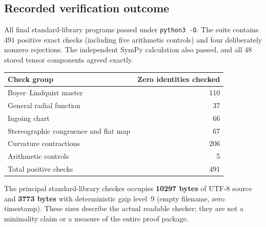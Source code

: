 \subsection*{Recorded verification outcome}
All final standard-library programs passed under \texttt{python3 -O}. The suite contains $491$ positive exact checks (including five arithmetic controls) and four deliberately nonzero rejections. The independent SymPy calculation also passed, and all $48$ stored tensor components agreed exactly.

\begin{center}
\begin{tabular}{lr}\toprule
Check group & Zero identities checked\\\midrule
Boyer--Lindquist master & 110\\
General radial function & 37\\
Ingoing chart & 66\\
Stereographic congruence and flat map & 67\\
Curvature contractions & 206\\
Arithmetic controls & 5\\
\midrule Total positive checks & 491\\
\bottomrule\end{tabular}\end{center}

The principal standard-library checker occupies \textbf{10297 bytes} of UTF-8 source and \textbf{3773 bytes} with deterministic gzip level~9 (empty filename, zero timestamp). These sizes describe the actual readable checker; they are not a minimality claim or a measure of the entire proof package.
